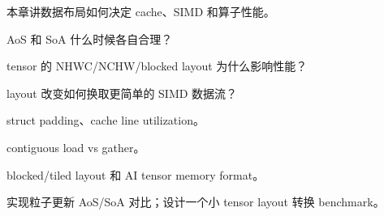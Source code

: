 {本章讲数据布局如何决定 cache、SIMD 和算子性能。}
{\item AoS 和 SoA 什么时候各自合理？
\item tensor 的 NHWC/NCHW/blocked layout 为什么影响性能？
\item layout 改变如何换取更简单的 SIMD 数据流？}
{\item struct padding、cache line utilization。
\item contiguous load vs gather。
\item blocked/tiled layout 和 AI tensor memory format。}
{实现粒子更新 AoS/SoA 对比；设计一个小 tensor layout 转换 benchmark。}
